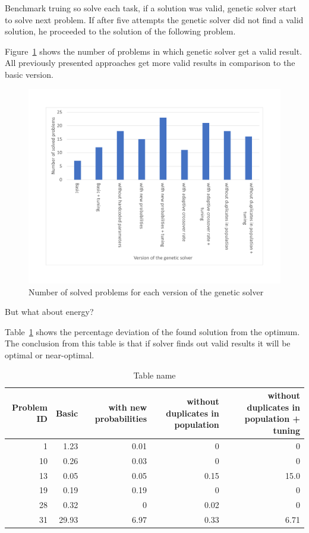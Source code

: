 Benchmark truing so solve each task, if a solution was valid, genetic solver start to solve next problem. If after five attempts the genetic solver did not find a valid solution, he proceeded to the solution of the following problem.

Figure~\ref{fig:EvaluationNumberOfSolvedProblems} shows the number of problems in which genetic solver get a valid result.
All previously presented approaches get more valid results in comparison to the basic version.
\begin{figure}
	\centering
	\includegraphics[width=\textwidth]{images/EvaluationNumberOfSolvedProblems.pdf}
	\caption[Number of problems for each version of the genetic solver]{Number of solved problems for each version of the genetic solver}
	\label{fig:EvaluationNumberOfSolvedProblems}
\end{figure}


But what about energy?


Table~\ref{tab:EnergyTable} shows the percentage deviation of the found solution from the optimum.
The conclusion from this table is that if solver finds out valid results it will be optimal or near-optimal.

\begin{table}
	\begin{tabularx}{\textwidth}{@{}rrrrr@{}}
		\toprule
		\textbf{Problem ID} & \textbf{Basic} &
		\textbf{with new probabilities} & \textbf{without duplicates in population} & \textbf{without duplicates in population + tuning} 
		\tabularnewline
		\midrule
		1 & 1.23 & 0.01 & 0 & 0
		\tabularnewline
		10 & 0.26 & 0.03 & 0 & 0
		\tabularnewline
		13 & 0.05 & 0.05 & 0.15 & 15.0
		\tabularnewline
		19 & 0.19 & 0.19 & 0 & 0
		\tabularnewline
		28 & 0.32 & 0 & 0.02 & 0
		\tabularnewline
		31 & 29.93 & 6.97 & 0.33 & 6.71
		\tabularnewline
		\bottomrule
	\end{tabularx}
	\caption{Table name}\label{tab:EnergyTable}
\end{table}

